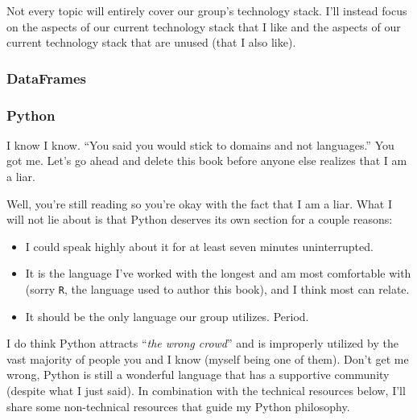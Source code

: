 \documentclass[
]{book}
\theoremstyle{definition}
\theoremstyle{definition}
\theoremstyle{definition}
\theoremstyle{definition}
\theoremstyle{remark}
\begin{document}
Not every topic will entirely cover our group's technology stack. I'll instead
focus on the aspects of our current technology stack that I like and the aspects
of our current technology stack that are unused (that I also like).

\hypertarget{dataframes}{%
\subsubsection{DataFrames}\label{dataframes}}

\hypertarget{python}{%
\subsubsection{Python}\label{python}}

I know I know. ``You said you would stick to domains and not languages.'' You got
me. Let's go ahead and delete this book before anyone else realizes that I am a
liar.

Well, you're still reading so you're okay with the fact that I am a liar. What I
will not lie about is that Python deserves its own section for a couple reasons:

\begin{itemize}
\item
  I could speak highly about it for at least seven minutes uninterrupted.
\item
  It is the language I've worked with the longest and am most comfortable with
  (sorry \texttt{R}, the language used to author this book), and I think most can relate.
\item
  It should be the only language our group utilizes. Period.
\end{itemize}

I do think Python attracts ``\emph{the wrong crowd}'' and is improperly utilized by the
vast majority of people you and I know (myself being one of them). Don't get me
wrong, Python is still a wonderful language that has a supportive community
(despite what I just said). In combination with the technical resources below,
I'll share some non-technical resources that guide my Python philosophy.
\end{document}
